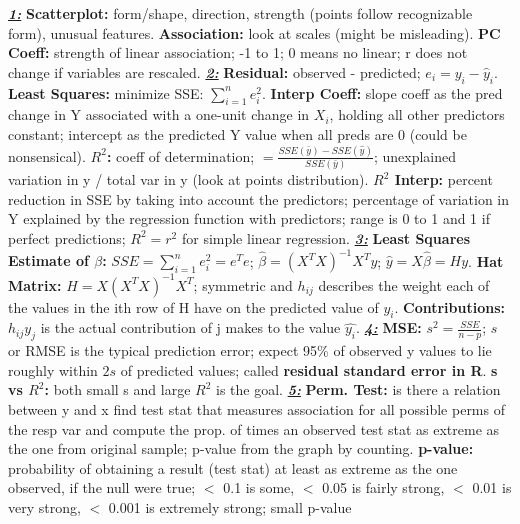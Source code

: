 \documentclass[8pt]{extarticle}
\begin{document}

\textit{\textbf{\underline{1:}}}
\textbf{Scatterplot:} form/shape, direction, strength (points follow 
recognizable form), unusual features.
\textbf{Association:} look at scales (might be misleading).
\textbf{PC Coeff:} strength of linear association; -1 to 1; 0 means no linear; r
does not change if variables are rescaled.
\textit{\textbf{\underline{2:}}}
\textbf{Residual:} observed - predicted; $e_i = y_i - \hat{y}_i$.
\textbf{Least Squares:} minimize SSE: $\sum_{i=1}^{n} e_i^2$.
\textbf{Interp Coeff:} slope coeff as the pred change in Y associated with a 
one-unit change in $X_i$, holding all other predictors constant; intercept as the 
predicted Y value when all preds are 0 (could be nonsensical).
\textbf{$R^2$:} coeff of determination; $ = \frac{SSE(\bar{y}) - 
SSE(\hat{y})}{SSE(\bar{y})}$;
unexplained variation in y / total var in y (look at points distribution).
\textbf{$R^2$ Interp:} percent reduction in SSE by taking into
account the predictors; percentage of variation in Y explained by the regression 
function with predictors; range is 0 to 1 and 1 if perfect predictions; $R^2 = r^2$
for simple linear regression.
\textit{\textbf{\underline{3:}}}
\textbf{Least Squares Estimate of $\beta$:} $SSE = \sum_{i=1}^{n} e^2_i = e^Te$;
$\hat{\beta} = (X^TX)^{-1}X^Ty$; $\hat{y} = X\hat{\beta} = Hy$.
\textbf{Hat Matrix:} $H = X(X^TX)^{-1}X^T$; symmetric and $h_{ij}$ describes 
the weight each of the values in the ith row of H have on the predicted value 
of $y_i$.
\textbf{Contributions:} $h_{ij}y_j$ is the actual contribution of j makes to the 
value $\hat{y_i}$.
\textit{\textbf{\underline{4:}}}
\textbf{MSE:} $s^2 = \frac{SSE}{n - p}$; $s$ or RMSE is the typical prediction 
error; expect 95\% of observed y values to lie roughly within $2s$ of predicted 
values; called \textbf{residual standard error in R}.
\textbf{s vs $R^2$:} both small s and large $R^2$ is the goal.
\textit{\textbf{\underline{5:}}}
\textbf{Perm. Test:} is there a relation between y and x find test stat that 
measures association for all possible perms of the resp var and compute the prop.
of times an observed test stat as extreme as the one from original sample; p-value 
from the graph by counting.
\textbf{p-value:} probability of obtaining a result (test stat) at least as extreme 
as the one observed, if the null were true; $<$ 0.1 is some, $<$ 0.05 is fairly 
strong, $<$ 0.01 is very strong, $<$ 0.001 is extremely strong; small p-value 
\end{document}
